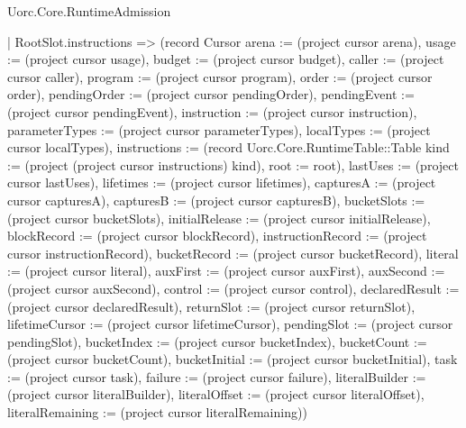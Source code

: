 \begin{lexlean}{Uorc.Core.RuntimeAdmission}
\begin{semanticmodule}
{    | RootSlot.instructions => (record Cursor {arena := (project cursor arena), usage := (project cursor usage), budget := (project cursor budget), caller := (project cursor caller), program := (project cursor program), order := (project cursor order), pendingOrder := (project cursor pendingOrder), pendingEvent := (project cursor pendingEvent), instruction := (project cursor instruction), parameterTypes := (project cursor parameterTypes), localTypes := (project cursor localTypes), instructions := (record Uorc.Core.RuntimeTable::Table {kind := (project (project cursor instructions) kind), root := root}), lastUses := (project cursor lastUses), lifetimes := (project cursor lifetimes), capturesA := (project cursor capturesA), capturesB := (project cursor capturesB), bucketSlots := (project cursor bucketSlots), initialRelease := (project cursor initialRelease), blockRecord := (project cursor blockRecord), instructionRecord := (project cursor instructionRecord), bucketRecord := (project cursor bucketRecord), literal := (project cursor literal), auxFirst := (project cursor auxFirst), auxSecond := (project cursor auxSecond), control := (project cursor control), declaredResult := (project cursor declaredResult), returnSlot := (project cursor returnSlot), lifetimeCursor := (project cursor lifetimeCursor), pendingSlot := (project cursor pendingSlot), bucketIndex := (project cursor bucketIndex), bucketCount := (project cursor bucketCount), bucketInitial := (project cursor bucketInitial), task := (project cursor task), failure := (project cursor failure), literalBuilder := (project cursor literalBuilder), literalOffset := (project cursor literalOffset), literalRemaining := (project cursor literalRemaining)})
}
\end{semanticmodule}
\end{lexlean}
